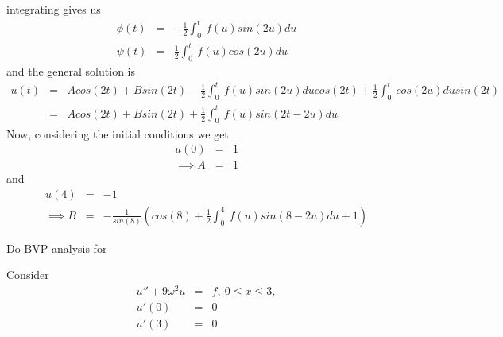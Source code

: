 \documentclass[11pt]{SelfArxOneColBMN}
\begin{document}
\begin{exercise}
\begin{solution}
    integrating gives us
    \begin{eqnarray*}
      \phi(t) &=& -\frac{1}{2}\int_0^t\: f(u)sin(2u)du\\
      \psi(t) &=& \frac{1}{2}\int_0^t\: f(u)cos(2u)du
    \end{eqnarray*}
    and the general solution is
    \begin{eqnarray*}
      u(t) &=& Acos(2t) + Bsin(2t) - \frac{1}{2}\int_0^t\: f(u)sin(2u)ducos(2t) + \frac{1}{2}\int_0^t\: cos(2u)dusin(2t)\\
      &=& Acos(2t) + Bsin(2t) + \frac{1}{2}\int_0^t\: f(u)sin(2t - 2u)du
    \end{eqnarray*}
    Now, considering the initial conditions we get
    \begin{eqnarray*}
      u(0) &=& 1\\
      \implies A &=& 1
    \end{eqnarray*}
    and
    \begin{eqnarray*}
      u(4) &=& -1\\
      \implies B &=& -\frac{1}{sin(8)}(cos(8) + \frac{1}{2}\int_0^4\: f(u)sin(8 - 2u)du + 1)
    \end{eqnarray*}
  \end{solution}
\end{exercise}

\noindent Do BVP analysis for
\begin{exercise}
 Consider
  \begin{eqnarray*}
    u'' + 9\omega^2u &=& f, \: 0 \leq x \leq 3,\\
    u'(0) &=& 0\\
    u'(3) &=& 0\\
  \end{eqnarray*}
\end{exercise}
\end{document}
